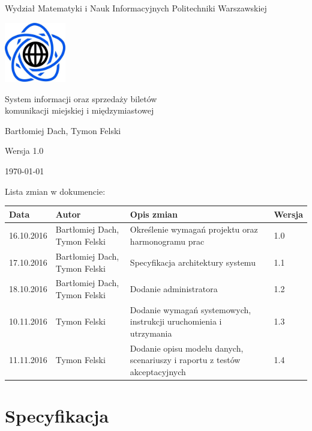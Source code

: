\documentclass[10pt,a4paper]{article}
\begin{document}
\begin{titlepage}
	\centering
	{\Large Wydział Matematyki i Nauk Informacyjnych Politechniki Warszawskiej \par}
	\vspace{1cm}
	\includegraphics[width=0.2\textwidth]{logo.png} \par
	\vspace{5cm}
	{\LARGE System informacji oraz sprzedaży biletów\\komunikacji miejskiej i międzymiastowej \par}
	\vspace{0.5cm}
	{\Large Bartłomiej Dach, Tymon Felski \par}
	\vspace{1.5cm}
	{\Large Wersja 1.0 \par}
	\vspace{1.5cm}
	{\Large \today \par}
\end{titlepage}
Lista zmian w dokumencie:
\begin{table}[H]
\def\arraystretch{1.5}
\begin{tabularx}{\textwidth}{|l|l|X|l|}
	\hline
	\textbf{Data} & \textbf{Autor} & \textbf{Opis zmian} & \textbf{Wersja} \\
	\hline
	16.10.2016 & Bartłomiej Dach, Tymon Felski & Określenie wymagań projektu oraz harmonogramu prac & 1.0 \\
	\hline
	17.10.2016 & Bartłomiej Dach, Tymon Felski & Specyfikacja architektury systemu & 1.1 \\
	\hline
	18.10.2016 & Bartłomiej Dach, Tymon Felski & Dodanie administratora & 1.2 \\
	\hline
	10.11.2016 & Tymon Felski & Dodanie wymagań systemowych, instrukcji uruchomienia i utrzymania & 1.3 \\
	\hline
	11.11.2016 & Tymon Felski & Dodanie opisu modelu danych, scenariuszy i raportu z testów akceptacyjnych & 1.4 \\
	\hline
\end{tabularx}
\end{table}

\tableofcontents
\newpage

\section{Specyfikacja}
\end{document}
